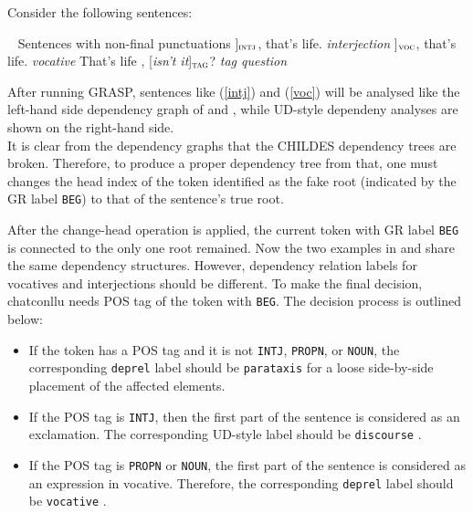 Consider the following sentences:

\pex~ Sentences with non-final punctuations\label{roots}
\a {[\sl Well\/}]$_{\text{\sc intj}}$, that's life.        \hfill {\sl interjection}\label{intj}
\a {[\sl  Son\/}]$_{\text{\sc voc}}$, that's life.         \hfill {\sl vocative}\label{voc}
\a That's life , {[\sl isn't it}]$_{\text{\sc tag}}$?    \hfill {\sl tag question}\label{tagq}
\xe


After running GRASP, sentences like (\ref{intj}) and (\ref{voc}) will be analysed like the left-hand side dependency graph of  and , while UD-style dependeny analyses are shown on the right-hand side.\\


It is clear from the dependency graphs that the CHILDES dependency trees are broken. Therefore, to produce a proper dependency tree from that, one must changes the head index of the token identified as the fake root (indicated by the GR label \texttt{BEG}) to that of the sentence's true root.

After the change-head operation is applied, the current token with GR label \texttt{BEG} is connected to the only one root remained. Now the two examples in  and  share the same dependency structures. However, dependency relation labels for vocatives and interjections should be different. To make the final decision, chatconllu needs POS tag of the token with \texttt{BEG}. The decision process is outlined below:\\

\begin{itemize}
	\item If the token has a POS tag and it is not \texttt{INTJ}, \texttt{PROPN}, or \texttt{NOUN}, the corresponding \texttt{deprel}  label should be \texttt{parataxis} for a loose side-by-side placement of the affected elements.
	\item If the POS tag is \texttt{INTJ}, then the first part of the sentence is considered as an exclamation. The corresponding UD-style label should be \texttt{discourse} .
	\item If the POS tag is \texttt{PROPN} or \texttt{NOUN}, the first part of the sentence is considered as an expression in vocative. Therefore, the corresponding \texttt{deprel} label should be \texttt{vocative} .
\end{itemize}

